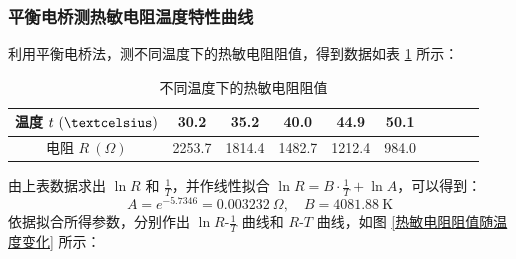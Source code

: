\documentclass[UTF8]{article}
\theoremstyle{MyLineTheoremStyle} %
\theoremstyle{MyBlockTheoremStyle} %
\theoremstyle{MySubsubsectionStyle} %
\begin{document}
\subsubsection{平衡电桥测热敏电阻温度特性曲线}
利用平衡电桥法，测不同温度下的热敏电阻阻值，得到数据如表 \ref{不同温度下的热敏电阻阻值} 所示：
\begin{table}[H]\centering
    \caption{不同温度下的热敏电阻阻值}
    \label{不同温度下的热敏电阻阻值}
\begin{tabular}{cccccccccc}\toprule
    温度 $t\ ( \textcelsius)$  & 30.2 &35.2 &40.0 &44.9 &50.1\\
    \midrule
    电阻 $R \ (\Omega)$ &  2253.7 &1814.4 &1482.7 &1212.4 &984.0\\
    \bottomrule
\end{tabular}
\end{table}
由上表数据求出 $\ln R$ 和 $\frac{1}{T}$，并作线性拟合 $\ln R = B\cdot \frac{1}{T} + \ln A$，可以得到：
\begin{equation}
A = e^{-5.7346} = 0.003232 \ \Omega,\quad B = 4081.88 \ \mathrm{K}
\end{equation}
依据拟合所得参数，分别作出 $\ln R$-$\frac{1}{T}$ 曲线和 $R$-$T$ 曲线，如图 \ref{热敏电阻阻值随温度变化} 所示：
\end{document}

